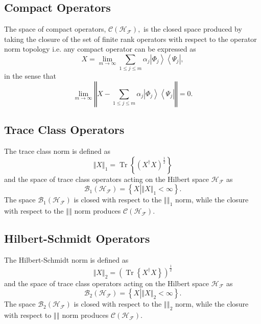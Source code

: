 \documentclass[aps,preprint]{revtex4}%
\begin{document}
\subsection{Compact Operators}

The space of compact operators, $\mathcal{C}\left(  \mathcal{H}_{\mathcal{F}%
}\right)  ,$ is the closed space produced by taking the closure of the set of
finite rank operators with respect to the operator norm topology i.e. any
compact operator can be expressed as
\begin{equation}
X=\lim_{m\rightarrow\infty}\sum_{1\leq j\leq m}\alpha_{j}\left\vert \Phi
_{j}\right\rangle \left\langle \Psi_{j}\right\vert ,
\end{equation}
in the sense that
\begin{equation}
\lim_{m\rightarrow\infty}\left\Vert X-\sum_{1\leq j\leq m}\alpha_{j}\left\vert
\Phi_{j}\right\rangle \left\langle \Psi_{j}\right\vert \right\Vert =0.
\end{equation}


\subsection{Trace Class Operators}

The trace class norm is defined as
\begin{equation}
\left\Vert X\right\Vert _{1}=\operatorname*{Tr}\left\{  \left(  X^{\dagger
}X\right)  ^{\frac{1}{2}}\right\}
\end{equation}
and the space of trace class operators acting on the Hilbert space
$\mathcal{H}_{\mathcal{F}}$ as
\begin{equation}
\mathcal{B}_{1}\left(  \mathcal{H}_{\mathcal{F}}\right)  =\left\{  X\left\vert
\left\Vert X\right\Vert _{1}<\infty\right.  \right\}  .
\end{equation}
The space $\mathcal{B}_{1}\left(  \mathcal{H}_{\mathcal{F}}\right)  $ is
closed with respect to the $\left\Vert {}\right\Vert _{1}$ norm, while the
closure with respect to the $\left\Vert {}\right\Vert $ norm produces
$\mathcal{C}\left(  \mathcal{H}_{\mathcal{F}}\right)  .$

\subsection{Hilbert-Schmidt Operators}

The Hilbert-Schmidt norm is defined as
\begin{equation}
\left\Vert X\right\Vert _{2}=\left(  \operatorname*{Tr}\left\{  X^{\dagger
}X\right\}  \right)  ^{\frac{1}{2}}%
\end{equation}
and the space of trace class operators acting on the Hilbert space
$\mathcal{H}_{\mathcal{F}}$ as
\begin{equation}
\mathcal{B}_{2}\left(  \mathcal{H}_{\mathcal{F}}\right)  =\left\{  X\left\vert
\left\Vert X\right\Vert _{2}<\infty\right.  \right\}  .
\end{equation}
The space $\mathcal{B}_{2}\left(  \mathcal{H}_{\mathcal{F}}\right)  $ is
closed with respect to the $\left\Vert {}\right\Vert _{2}$ norm, while the
closure with respect to $\left\Vert {}\right\Vert $ norm produces
$\mathcal{C}\left(  \mathcal{H}_{\mathcal{F}}\right)  .$
\end{document}
